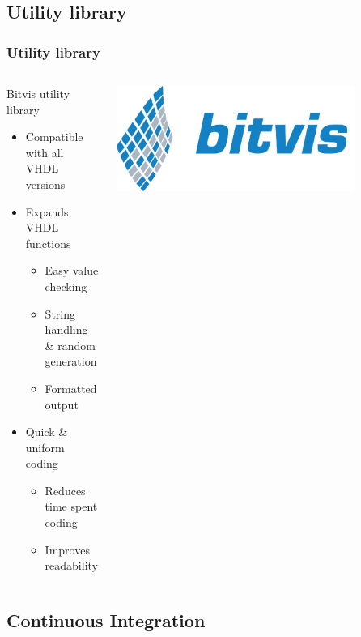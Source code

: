\documentclass[british,10pt]{beamer}
\begin{document}
\subsection{Utility library}

\begin{frame}\frametitle{Utility library}
\begin{columns}
\begin{column}{0.6\textwidth}
Bitvis utility library
\begin{itemize}
\item Compatible with all VHDL versions
\item Expands VHDL functions
\begin{itemize}
\item Easy value checking
\item String handling \& random generation
\item Formatted output
\end{itemize}
\item Quick \& uniform coding
\begin{itemize}
\item Reduces time spent coding
\item Improves readability
\end{itemize}
\end{itemize}
\end{column}
\includegraphics[width=0.8\textwidth]{images/bitvis.png}
\end{columns}
\end{frame}

\subsection{Continuous Integration}
\end{document}
